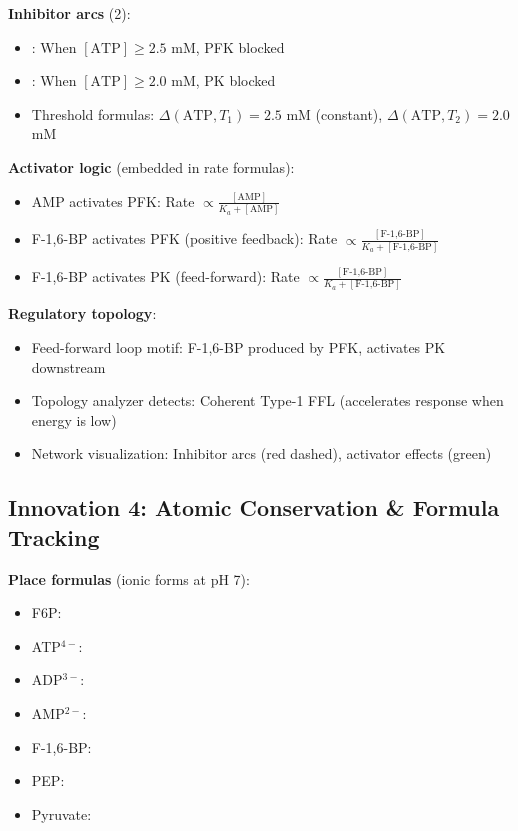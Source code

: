 \textbf{Inhibitor arcs} (2):

\begin{itemize}
    \item {}: When $[\text{ATP}] \geq 2.5$ mM, PFK blocked
    \item {}: When $[\text{ATP}] \geq 2.0$ mM, PK blocked
    \item Threshold formulas: $\Delta(\text{ATP}, T_1) = 2.5$ mM (constant), $\Delta(\text{ATP}, T_2) = 2.0$ mM
\end{itemize}

\textbf{Activator logic} (embedded in rate formulas):

\begin{itemize}
    \item AMP activates PFK: Rate $\propto \frac{[\text{AMP}]}{K_a + [\text{AMP}]}$
    \item F-1,6-BP activates PFK (positive feedback): Rate $\propto \frac{[\text{F-1,6-BP}]}{K_a + [\text{F-1,6-BP}]}$
    \item F-1,6-BP activates PK (feed-forward): Rate $\propto \frac{[\text{F-1,6-BP}]}{K_a + [\text{F-1,6-BP}]}$
\end{itemize}

\textbf{Regulatory topology}:

\begin{itemize}
    \item Feed-forward loop motif: F-1,6-BP produced by PFK, activates PK downstream
    \item Topology analyzer detects: Coherent Type-1 FFL (accelerates response when energy is low)
    \item Network visualization: Inhibitor arcs (red dashed), activator effects (green)
\end{itemize}

\subsection{Innovation 4: Atomic Conservation \& Formula Tracking}
\label{subsec:energy-conservation}

\textbf{Place formulas} (ionic forms at pH 7):

\begin{itemize}
    \item F6P: 
    \item ATP$^{4-}$: 
    \item ADP$^{3-}$: 
    \item AMP$^{2-}$: 
    \item F-1,6-BP: 
    \item PEP: 
    \item Pyruvate: 
\end{itemize}

